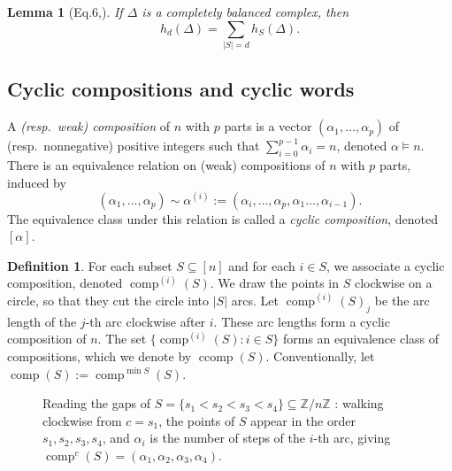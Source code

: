 \documentclass[12pt,reqno]{amsart}
\theoremstyle{plain}
\newtheorem{lemma}[theorem]{Lemma}
\theoremstyle{definition}
\newtheorem{definition}[theorem]{Definition}
\newcommand{\Z}{\mathbb{Z}}
\DeclareMathOperator{\comp}{comp}
\DeclareMathOperator{\ccomp}{ccomp}
\begin{document}
\begin{lemma}[Eq.6,\cite{Stanley1979}]
	If $\Delta$ is a completely balanced complex, then
	\begin{equation}\label{eq:flagh}
		h_d(\Delta)=\sum_{|S|=d} h_S(\Delta).
	\end{equation}
\end{lemma}

\subsection{Cyclic compositions and cyclic words}
A \emph{(resp.\ weak) composition} of $n$ with $p$ parts is a vector $(\alpha_1,\dots,\alpha_p)$ of (resp.\
nonnegative) positive integers such that $\sum_{i=0}^{p-1}\alpha_i = n$, denoted $\alpha \models n$. There is an
equivalence relation on (weak) compositions of $ n $ with $ p $ parts, induced by
\[
	(\alpha_1,\dots,\alpha_p) \sim \alpha^{(i)}:= (\alpha_i,\dots,\alpha_p,\alpha_1\dots,\alpha_{i-1}).
\]
The equivalence class under this relation is called a \emph{cyclic composition}, denoted $ [\alpha] $.

\begin{definition}
	For each subset $ S \subseteq [n] $ and for each $i \in S$, we associate a cyclic composition, denoted
	$\comp^{(i)}(S)$. We draw the points in $S$ clockwise on a circle, so that they cut the circle into $ |S| $ arcs. Let
	$\comp^{(i)}(S)_j$ be the arc length of the $j$-th arc clockwise after $i$. These arc lengths form a cyclic composition
	of $n$. The set $\{\comp^{(i)}(S): i \in S\}$ forms an equivalence class of compositions, which we denote by $\ccomp(S)$.
	Conventionally, let $\comp(S):= \comp^{\min S}(S)$.
\end{definition}

\begin{figure}
	\centering
	\caption{Reading the gaps of $
			S=\{s_1<s_2<s_3<s_4\}\subseteq\Z/n\Z $
: walking clockwise from $ c=s_1 $, the points of $ S $ appear in the order $ s_1,s_2,s_3,s_4 $, and $ \alpha_i $
		is the number of steps of the $ i $-th arc, giving $
			\comp^{c}(S)=(\alpha_1,\alpha_2,\alpha_3,\alpha_4)$.}\label{fig:comp}
\end{figure}
\end{document}
